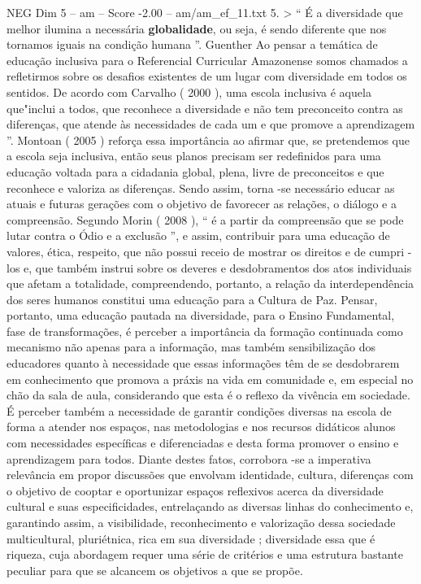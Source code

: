 \begin{textsample}{NEG Dim 5 – am – Score -2.00 – am/am\_ef\_11.txt}  \label{ex:f5_neg_221}
5. > “ É a diversidade que melhor ilumina a necessária \textbf{globalidade}, ou seja, é sendo diferente que nos tornamos iguais na condição humana ”.
Guenther Ao pensar a temática de educação inclusiva para o Referencial Curricular Amazonense somos chamados a refletirmos sobre os desafios existentes de um lugar com diversidade em todos os sentidos.
De acordo com Carvalho ( 2000 ), uma escola inclusiva é aquela que"inclui a todos, que reconhece a diversidade e não tem preconceito contra as diferenças, que atende às necessidades de cada um e que promove a aprendizagem ”.
Montoan ( 2005 ) reforça essa importância ao afirmar que, se pretendemos que a escola seja inclusiva, então seus planos precisam ser redefinidos para uma educação voltada para a cidadania global, plena, livre de preconceitos e que reconhece e valoriza as diferenças.
Sendo assim, torna -se necessário educar as atuais e futuras gerações com o objetivo de favorecer as relações, o diálogo e a compreensão.
Segundo Morin ( 2008 ), “ é a partir da compreensão que se pode lutar contra o Ódio e a exclusão ”, e assim, contribuir para uma educação de valores, ética, respeito, que não possui receio de mostrar os direitos e de cumpri -los e, que também instrui sobre os deveres e desdobramentos dos atos individuais que afetam a totalidade, compreendendo, portanto, a relação da interdependência dos seres humanos constitui uma educação para a Cultura de Paz.
Pensar, portanto, uma educação pautada na diversidade, para o Ensino Fundamental, fase de transformações, é perceber a importância da formação continuada como mecanismo não apenas para a informação, mas também sensibilização dos educadores quanto à necessidade que essas informações têm de se desdobrarem em conhecimento que promova a práxis na vida em comunidade e, em especial no chão da sala de aula, considerando que esta é o reflexo da vivência em sociedade.
É perceber também a necessidade de garantir condições diversas na escola de forma a atender nos espaços, nas metodologias e nos recursos didáticos alunos com necessidades específicas e diferenciadas e desta forma promover o ensino e aprendizagem para todos.
Diante destes fatos, corrobora -se a imperativa relevância em propor discussões que envolvam identidade, cultura, diferenças com o objetivo de cooptar e oportunizar espaços reflexivos acerca da diversidade cultural e suas especificidades, entrelaçando as diversas linhas do conhecimento e, garantindo assim, a visibilidade, reconhecimento e valorização dessa sociedade multicultural, pluriétnica, rica em sua diversidade ; diversidade essa que é riqueza, cuja abordagem requer uma série de critérios e uma estrutura bastante peculiar para que se alcancem os objetivos a que se propõe.

\end{textsample}
